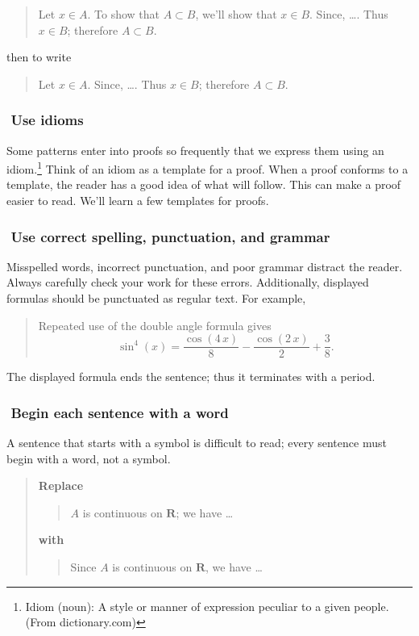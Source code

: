 \documentclass[12pt]{article}
\newcounter{ex}\setcounter{ex}{0}
\newcommand{\ex}{%
\hspace{-0.2in} \setcounter{ex}{\value{ex}+1}
\theex \,\,}
\newcounter{id}\setcounter{id}{0}
\newcounter{se}\setcounter{se}{0}
\begin{document}
\begin{quote}
  Let $x \in A$.  To show that $ A \subset B$, we'll show that
  $x \in B$. Since, \dots. Thus $x \in B$; therefore $A \subset B$.
\end{quote}
then to write
\begin{quote}
  Let $x \in A$.  Since, \dots. Thus $x \in B$; therefore $A \subset B$.
\end{quote}

\subsubsection*{\ex  Use idioms}

Some patterns enter into proofs so frequently that we express them
using an idiom.\footnote{Idiom (noun): A style or manner of expression
peculiar to a given people. (From dictionary.com)} Think of an idiom
as a template for a proof.  When a proof conforms to a template, the
reader has a good idea of what will follow.  This can make a proof easier to
read. We'll learn a few templates for proofs. 



\subsubsection*{\ex  Use correct spelling, punctuation, and grammar}

Misspelled words, incorrect punctuation, and poor grammar distract the reader.  
Always carefully check your work for these errors. Additionally, 
displayed formulas should be punctuated as regular text.  For example,
\begin{quote}
Repeated use of the  double angle formula gives
\[
   \sin^4(x) = \frac {\cos \left(4\,x\right)}{8}-\frac {\cos \left(2\,x\right)}{2%
 }+\frac {3}{8}. 
\]
\end{quote}
The displayed formula ends the sentence; thus it terminates with a period.

\subsubsection*{\ex  Begin each sentence with a word}  


A sentence that starts with a symbol is difficult to 
read; every sentence must begin with a word, not a symbol.

\begin{quote}
\textbf{\textbf{Replace}}
\begin{quote}
$A$ is continuous on $\mathbf{R}$; we have \dots
\end{quote}
\textbf{with}
\begin{quote}
Since $A$ is continuous on $\mathbf{R}$, we have \dots
\end{quote}
\end{quote}
\end{document}
